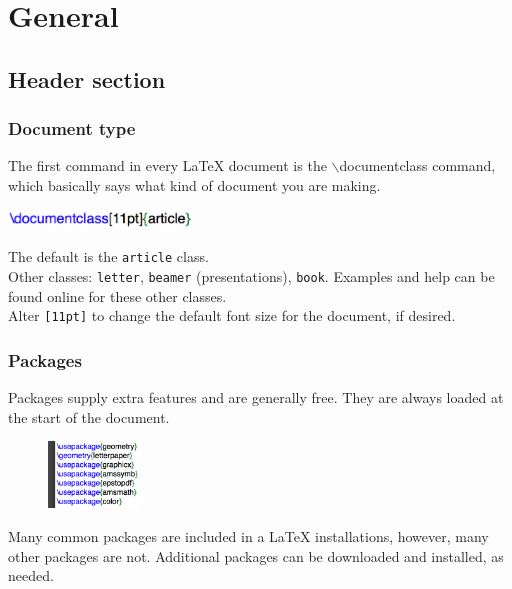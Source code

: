 \documentclass[slidestop,compress,mathserif]{beamer}
\begin{document}

\section[General]{General}

\subsection[Header section]{Header section}
\begin{frame} \frametitle{Document type}
The first command in every LaTeX document is the {\color{command}$\backslash$documentclass} command, which basically says what kind of document you are making.
\begin{center}
\includegraphics[height=0.2in]{basicsOfLatex/general/documentClass}
\end{center}
The default is the \texttt{\color{highlight}article} class.
\vspace{5mm}\\
Other classes: \texttt{\color{highlight}letter}, \texttt{\color{highlight}beamer} (presentations), \texttt{\color{highlight}book}. Examples and help can be found online for these other classes.
\vspace{5mm} \\
Alter \texttt{\color{highlight}[11pt]} to change the default font size for the document, if desired.
\end{frame}

\begin{frame} \frametitle{Packages}
Packages supply extra features and are generally free. They are always loaded at the start of the document. \\
\begin{figure}[htbp]
   \centering
   \includegraphics[height=0.7in]{basicsOfLatex/general/packages}
\end{figure}
Many common packages are included in a LaTeX installations, however, many other packages are not. Additional packages can be downloaded and installed, as needed.
\end{frame}
\end{document}
